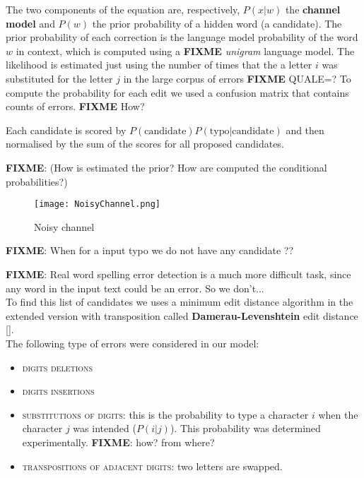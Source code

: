 The two components of the equation are, respectively, $P(x|w)$ the \textbf{channel model} and $P(w)$ the prior 
probability of a hidden word (a candidate).
The prior probability of each correction is the language model probability of the word $w$ in context, which is 
computed using a \textbf{FIXME} \textit{unigram} language model. 
The likelihood is estimated just using the number of times that the a letter $i$ was substituted for the letter $j$ in 
the large corpus of errors \textbf{FIXME} QUALE=? 
To compute the probability for each edit we used a confusion matrix that contains counts of errors. \textbf{FIXME} 
How? 



Each candidate is scored by $P(\mbox{candidate})P(\mbox{typo}|\mbox{candidate})$ and then normalised by the 
sum of the scores for all proposed candidates.

\textbf{FIXME}:  (How is estimated the prior? How are computed the conditional probabilities?)

\begin{figure}[H]
	\centering
	\texttt{[image: NoisyChannel.png]}
	\caption{Noisy channel}
	\label{fig:noisychannel}
\end{figure}

\textbf{FIXME}: When for a input typo we do not have any candidate ?? 

\textbf{FIXME}: Real word spelling error detection is a much more difficult task, since any word in the input text 
could be 
an error. So we don’t...\\


To find this list of candidates we uses a minimum edit distance algorithm in the extended version with 
transposition called \textbf{Damerau-Levenshtein} edit distance \ref{}.	\\

The following type of errors were considered in our model:
\begin{itemize}
	\item \textsc{digits deletions}
	\item \textsc{digits insertions}
	\item \textsc{substitutions of digits}: this is the probability to type a character $i$ when the character $j$ was 
	intended ($P(i|j)$). This probability was determined experimentally. \textbf{FIXME}: how? from where?
	\item \textsc{transpositions of adjacent digits}: two letters are swapped.
\end{itemize}

